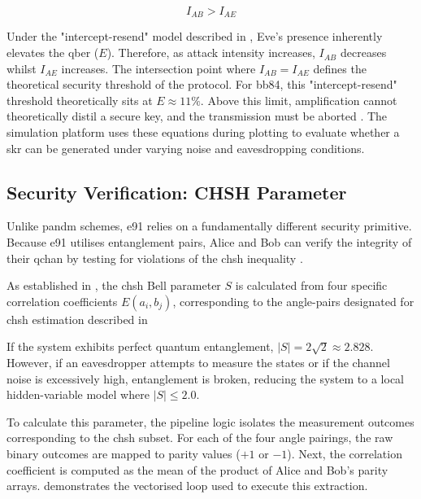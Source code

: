 \begin{equation}
I_{AB} > I_{AE}
\label{eq:secure_condition}
\end{equation}

Under the "intercept-resend" model described in , Eve's presence inherently elevates the \gls{qber} ($E$). Therefore, as attack intensity increases, $I_{AB}$ decreases whilst $I_{AE}$ increases. The intersection point where $I_{AB} = I_{AE}$ defines the theoretical security threshold of the protocol. For \gls{bb84}, this "intercept-resend" threshold theoretically sits at $E \approx 11\%$. Above this limit, \gls{amplification} cannot theoretically distil a secure key, and the transmission must be aborted \cite{ShorPreskill2000}. The simulation platform uses these equations during plotting to evaluate whether a \gls{skr} can be generated under varying noise and eavesdropping conditions.

\subsection{Security Verification: CHSH Parameter}
\label{subsec:CHSH}

Unlike \gls{pandm} schemes, \gls{e91} relies on a fundamentally different security primitive. Because \gls{e91} utilises \gls{entanglement} pairs, Alice and Bob can verify the integrity of their \gls{qchan} by testing for violations of the \gls{chsh} inequality \cite{CHSH1969}.  
 
As established in , the \gls{chsh} Bell parameter $S$ is calculated from four specific correlation coefficients $E(a_i, b_j)$, corresponding to the angle-pairs designated for \gls{chsh} estimation described in  

If the system exhibits perfect quantum \gls{entanglement}, $|S| = 2\sqrt{2} \approx 2.828$. However, if an eavesdropper attempts to measure the states or if the channel noise is excessively high, \gls{entanglement} is broken, reducing the system to a local hidden-variable model where $|S| \leq 2.0$.

To calculate this parameter, the pipeline logic isolates the measurement outcomes corresponding to the \gls{chsh} subset. For each of the four angle pairings, the raw binary outcomes are mapped to parity values ($+1$ or $-1$). Next, the correlation coefficient is computed as the mean of the product of Alice and Bob's parity arrays.  demonstrates the vectorised loop used to execute this extraction.

